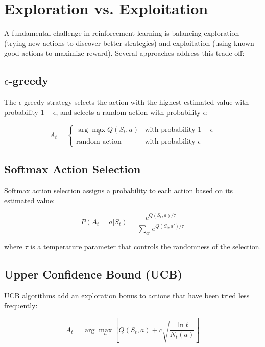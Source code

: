 \documentclass{article}
\begin{document}
\section{Exploration vs. Exploitation}

A fundamental challenge in reinforcement learning is balancing exploration (trying new actions to discover better strategies) and exploitation (using known good actions to maximize reward). Several approaches address this trade-off:

\subsection{$\epsilon$-greedy}

The $\epsilon$-greedy strategy selects the action with the highest estimated value with probability $1-\epsilon$, and selects a random action with probability $\epsilon$:

\begin{equation}
A_t = \begin{cases}
\arg\max_a Q(S_t, a) & \text{with probability } 1-\epsilon \\
\text{random action} & \text{with probability } \epsilon
\end{cases}
\end{equation}

\subsection{Softmax Action Selection}

Softmax action selection assigns a probability to each action based on its estimated value:

\begin{equation}
P(A_t = a | S_t) = \frac{e^{Q(S_t, a) / \tau}}{\sum_{a'} e^{Q(S_t, a') / \tau}}
\end{equation}

where $\tau$ is a temperature parameter that controls the randomness of the selection.

\subsection{Upper Confidence Bound (UCB)}

UCB algorithms add an exploration bonus to actions that have been tried less frequently:

\begin{equation}
A_t = \arg\max_a \left[ Q(S_t, a) + c \sqrt{\frac{\ln t}{N_t(a)}} \right]
\end{equation}
\end{document}
